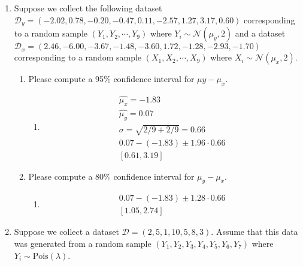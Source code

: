 \documentclass[krantz1,ChapterTOCs]{krantz}
\begin{document}
\begin{enumerate}
\begin{enumerate}
        
    \end{enumerate}
    
     \item Suppose we collect the following dataset $\mathcal{D}_{y} = (-2.02,  0.78, -0.20, -0.47,  0.11, -2.57,  1.27,  3.17, 0.60)$ corresponding to a random sample $(Y_{1},Y_{2},\cdots,Y_{9})$ where $Y_{i} \sim \mathcal{N}(\mu_{y},2)$ and a dataset $\mathcal{D}_{x} = (2.46, -6.00, -3.67, -1.48, -3.60,  1.72, -1.28, -2.93, -1.70)$ corresponding to a random sample $(X_{1},X_{2},\cdots,X_{9})$ where $X_{i} \sim \mathcal{N}(\mu_{x},2)$.
    
    \begin{enumerate}
        \item Please compute a 95\% confidence interval for $\mu{y} - \mu_{x}$.
        
        \begin{enumerate}
            \item {\color{red} 
               \begin{align}
               \hat{\mu_{x}} = -1.83    \\
               \hat{\mu_{y}} =  0.07   \\
               \sigma = \sqrt{  2/9 + 2/9 } = 0.66 \\
               0.07-(-1.83) \pm 1.96 \cdot 0.66\\
               [0.61 , 3.19 ]
               \end{align}
                 
            }
        \end{enumerate}
    
        
        \item Please compute a 80\% confidence interval for $\mu_{y} - \mu_{x}$.
        
        \begin{enumerate}
            \item {\color{red}
                \begin{align}
                    0.07-(-1.83) \pm 1.28 \cdot 0.66\\
               [ 1.05, 2.74 ]
                \end{align}
            
            }
        \end{enumerate}
    
    \end{enumerate}
        
        
    \item Suppose we collect a dataset $\mathcal{D} = \left(2,5,1,10,5,8,3 \right)$. Assume that this data was generated from a random sample $(Y_{1},Y_{2},Y_{3},Y_{4},Y_{5},Y_{6},Y_{7})$ where $Y_{i} \sim \text{Pois}(\lambda)$. 
    

\end{enumerate}
\end{document}
